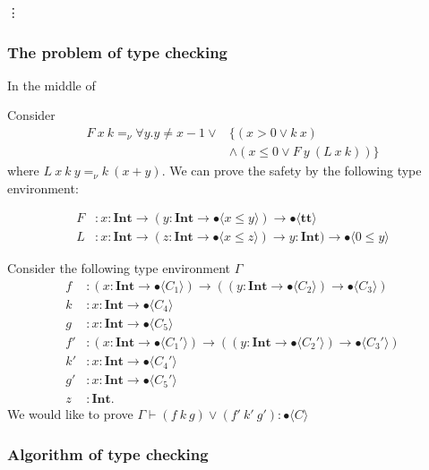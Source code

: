 \documentclass[runningheads]{llncs}
\newcommand \true {\textbf{tt}}
\newcommand \stypeint {\textbf{Int}}
\newcommand \stypebool {\bullet}
\newcommand \typeint[1]{{#1} : \stypeint}
\newcommand \typebool[1]{\stypebool \langle #1 \rangle}
\begin{document}
\vdots

\subsubsection{The problem of type checking}

In the middle of

Consider
\begin{align*}
    F\ x\ k =_\nu \forall y. y \neq x - 1 \lor
        & \{ (x > 0 \lor k\ x)\\
        & \land ( x \leq 0 \lor F\ y\ (L\ x\ k)) \}
\end{align*}
where \( L\ x\ k\ y =_\nu k\ (x + y) \).
We can prove the safety by the following type environment:

\begin{align*}
    F&: \typeint{x} \to (\typeint{y} \to \typebool{x \leq y}) \to
    \typebool{\true}\\
    L&: \typeint{x} \to (\typeint{z} \to \typebool{x \leq z}) \to
    \typeint{y}) \to \typebool{0 \leq y}
\end{align*}

Consider the following type environment \(\Gamma\)
\begin{align*}
    f&: (\typeint{x} \to \typebool{C_1}) \to ((\typeint{y} \to \typebool{C_2})
    \to \typebool{C_3})\\
    k&: \typeint{x} \to \typebool{C_4}\\
    g&: \typeint{x} \to \typebool{C_5}\\
    f'&: (\typeint{x} \to \typebool{C_1'}) \to ((\typeint{y} \to \typebool{C_2'})
    \to \typebool{C_3'})\\
    k'&: \typeint{x} \to \typebool{C_4'}\\
    g'&: \typeint{x} \to \typebool{C_5'}\\
    z&: \stypeint.
\end{align*}
We would like to prove \( \Gamma \vdash (f\ k\ g) \lor (f'\ k'\ g'):
\typebool{C}\)


\subsubsection{Algorithm of type checking}
\end{document}

